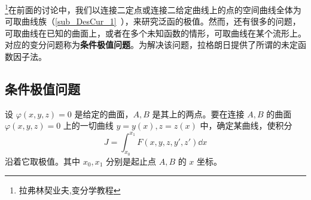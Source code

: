 
\footnote{拉弗林契业夫,变分学教程}在前面的讨论中，我们以连接二定点或连接二给定曲线上的点的空间曲线全体为可取曲线族（\autoref{sub_DesCur_1}~），来研究泛函的极值。然而，还有很多的问题，可取曲线在已知的曲面上，或者在多个未知函数的情形，可取曲线在某个流形上。对应的变分问题称为\textbf{条件极值问题}。为解决该问题，拉格朗日提供了所谓的未定函数因子法。
\subsection{条件极值问题}
设 $\varphi(x,y,z)=0$ 是给定的曲面，$A,B$ 是其上的两点。要在连接 $A,B$ 的曲面$\varphi(x,y,z)=0$ 上的一切曲线 $y=y(x),z=z(x)$ 中，确定某曲线，使积分
\begin{equation}\label{eq_CPLM_1}
J=\int_{x_0}^{x_1}F(x,y,z,y',z')\dd x
\end{equation}
沿着它取极值。其中 $x_0,x_1$ 分别是起止点 $A,B$ 的 $x$ 坐标。
